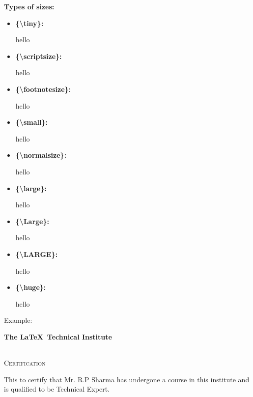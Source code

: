 \documentclass[11pt,a4paper]{report}
\theoremstyle{remark}
\theoremstyle{definition}
\begin{document}
			\begin{minipage}{0.5\textwidth}
				\textbf{Types of sizes:}
				\begin{itemize}
					\item \textbf{\{\textbackslash tiny\}:} \begin{tiny} hello \end{tiny}
					\item \textbf{\{\textbackslash scriptsize\}:} \begin{scriptsize} hello \end{scriptsize}
					\item \textbf{\{\textbackslash footnotesize\}:} \begin{footnotesize} hello \end{footnotesize}
					\item \textbf{\{\textbackslash small\}:} \begin{small} hello \end{small}
					\item \textbf{\{\textbackslash normalsize\}:} \begin{normalsize} hello \end{normalsize}
					\item \textbf{\{\textbackslash large\}:} \begin{large} hello \end{large}
					\item \textbf{\{\textbackslash Large\}:} \begin{Large} hello \end{Large}
					\item \textbf{\{\textbackslash LARGE\}:} \begin{LARGE} hello \end{LARGE}
					\item \textbf{\{\textbackslash huge\}:} \begin{huge} hello \end{huge}
				\end{itemize}
			\end{minipage}
			
			\noindent
			Example:
			\begin{center}  
				\begin{huge}  
					\textbf{The \LaTeX\ Technical Institute}\\  
				\end{huge}  
				\begin{LARGE}  
					\textsc{\\Certification}   
				\end{LARGE}    
				
			\end{center}  
			\noindent This to certify that Mr. R.P Sharma has undergone a course in this institute and is qualified to be Technical Expert.  
			
\end{document}
